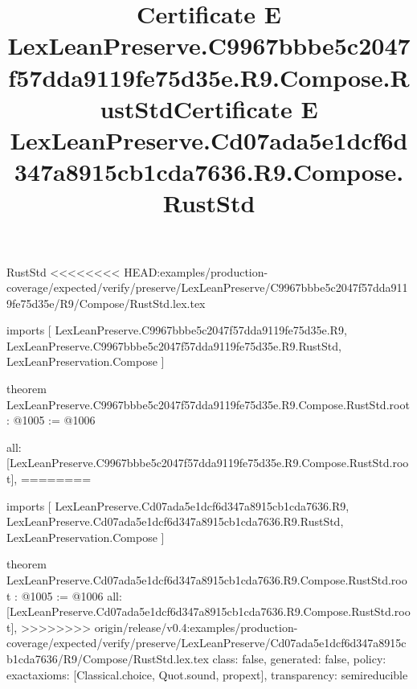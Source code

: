 \begin{lexlean}{RustStd}
<<<<<<<< HEAD:examples/production-coverage/expected/verify/preserve/LexLeanPreserve/C9967bbbe5c2047f57dda9119fe75d35e/R9/Compose/RustStd.lex.tex
\title{Certificate E LexLeanPreserve.C9967bbbe5c2047f57dda9119fe75d35e.R9.Compose.RustStd}
\begin{coremodule}
imports [
  LexLeanPreserve.C9967bbbe5c2047f57dda9119fe75d35e.R9,
  LexLeanPreserve.C9967bbbe5c2047f57dda9119fe75d35e.R9.RustStd,
  LexLeanPreservation.Compose
]

theorem LexLeanPreserve.C9967bbbe5c2047f57dda9119fe75d35e.R9.Compose.RustStd.root : @1005 := @1006 {
  all: [LexLeanPreserve.C9967bbbe5c2047f57dda9119fe75d35e.R9.Compose.RustStd.root],
========
\title{Certificate E LexLeanPreserve.Cd07ada5e1dcf6d347a8915cb1cda7636.R9.Compose.RustStd}
\begin{coremodule}
imports [
  LexLeanPreserve.Cd07ada5e1dcf6d347a8915cb1cda7636.R9,
  LexLeanPreserve.Cd07ada5e1dcf6d347a8915cb1cda7636.R9.RustStd,
  LexLeanPreservation.Compose
]

theorem LexLeanPreserve.Cd07ada5e1dcf6d347a8915cb1cda7636.R9.Compose.RustStd.root : @1005 := @1006 {
  all: [LexLeanPreserve.Cd07ada5e1dcf6d347a8915cb1cda7636.R9.Compose.RustStd.root],
>>>>>>>> origin/release/v0.4:examples/production-coverage/expected/verify/preserve/LexLeanPreserve/Cd07ada5e1dcf6d347a8915cb1cda7636/R9/Compose/RustStd.lex.tex
  class: false,
  generated: false,
  policy: exact{axioms: [Classical.choice, Quot.sound, propext]},
  transparency: semireducible
}


\end{coremodule}}
\end{coremodule}
\end{lexlean}
